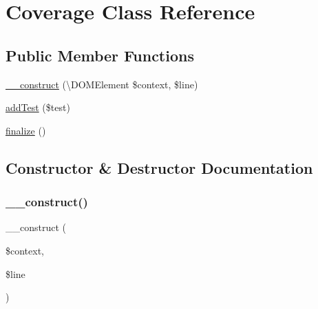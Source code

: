 \hypertarget{class_sebastian_bergmann_1_1_code_coverage_1_1_report_1_1_xml_1_1_coverage}{}\section{Coverage Class Reference}
\label{class_sebastian_bergmann_1_1_code_coverage_1_1_report_1_1_xml_1_1_coverage}
\subsection*{Public Member Functions}
\begin{DoxyCompactItemize}
\item 
\mbox{\hyperlink{class_sebastian_bergmann_1_1_code_coverage_1_1_report_1_1_xml_1_1_coverage_a41fc4ea29d5b0703bc4d2c4d9988da2a}{\+\_\+\+\_\+construct}} (\textbackslash{}D\+O\+M\+Element \$context, \$line)
\item 
\mbox{\hyperlink{class_sebastian_bergmann_1_1_code_coverage_1_1_report_1_1_xml_1_1_coverage_a86f5509bc4cdb9c364a3159cb111b107}{add\+Test}} (\$test)
\item 
\mbox{\hyperlink{class_sebastian_bergmann_1_1_code_coverage_1_1_report_1_1_xml_1_1_coverage_a9caaa1f5ea6177e55f13ebe7dec2bd60}{finalize}} ()
\end{DoxyCompactItemize}


\subsection{Constructor \& Destructor Documentation}
\mbox{\label{class_sebastian_bergmann_1_1_code_coverage_1_1_report_1_1_xml_1_1_coverage_a41fc4ea29d5b0703bc4d2c4d9988da2a}} 
\subsubsection{\texorpdfstring{\+\_\+\+\_\+construct()}{\_\_construct()}}
{\footnotesize\ttfamily \+\_\+\+\_\+construct (\begin{DoxyParamCaption}\item[{\textbackslash{}D\+O\+M\+Element}]{\$context,  }\item[{}]{\$line }\end{DoxyParamCaption})}



